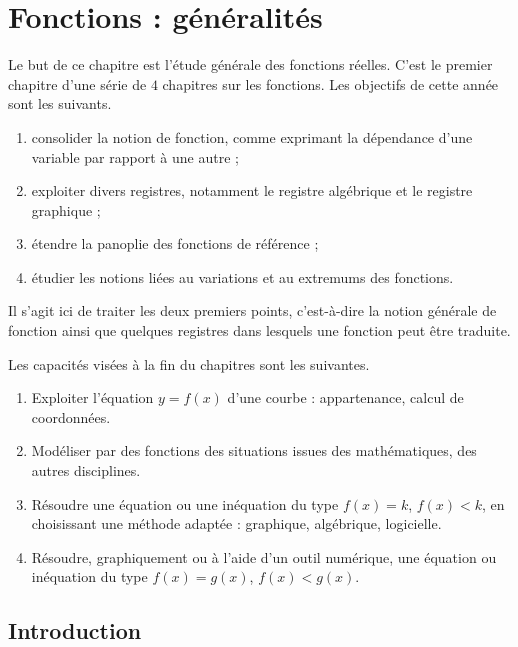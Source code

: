 \chapter{Fonctions : généralités}

Le but de ce chapitre est l'étude générale des fonctions réelles.
C'est le premier chapitre d'une série de $4$ chapitres sur les fonctions.
Les objectifs de cette année sont les suivants.
	\begin{enumerate}[label=$\bullet$]
		\item consolider la notion de fonction, comme exprimant la dépendance d'une variable par rapport à une autre ; 
		\item exploiter divers registres, notamment le registre algébrique et le registre graphique ;
		\item étendre la panoplie des fonctions de référence ;
		\item étudier les notions liées au variations et au extremums des fonctions.
	\end{enumerate}
Il s'agit ici de traiter les deux premiers points, c'est-à-dire la notion générale de fonction ainsi que quelques registres dans lesquels une fonction peut être traduite.

Les capacités visées à la fin du chapitres sont les suivantes.
	\begin{enumerate}
		\item Exploiter l'équation $y=f(x)$ d'une courbe : appartenance, calcul de coordonnées.
		\item Modéliser par des fonctions des situations issues des mathématiques, des autres disciplines.
		\item Résoudre une équation ou une inéquation du type $f(x)=k$, $f(x) < k$, en choisissant une méthode adaptée : graphique, algébrique, logicielle.
		\item Résoudre, graphiquement ou à l'aide d'un outil numérique, une équation ou inéquation du type $f(x)=g(x)$, $f(x) < g(x)$.
	\end{enumerate}

	\section{Introduction}
	
